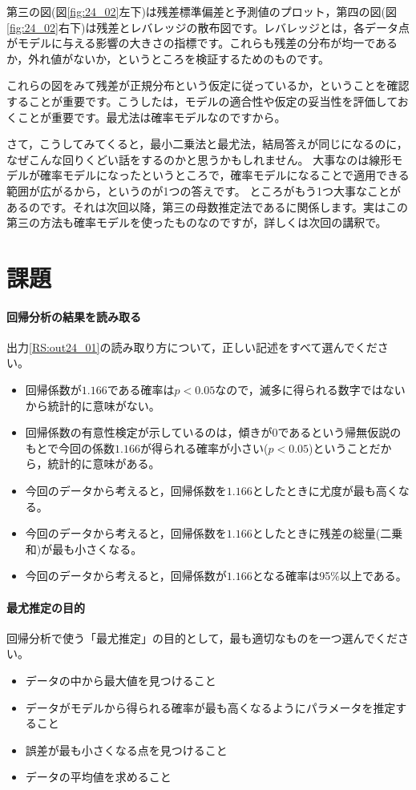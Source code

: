 \documentclass{ltjbook}
\begin{document}
第三の図(図\ref{fig:24_02}左下)は残差標準偏差と予測値のプロット，第四の図(図\ref{fig:24_02}右下)は残差とレバレッジの散布図です。レバレッジとは，各データ点がモデルに与える影響の大きさの指標です。これらも残差の分布が均一であるか，外れ値がないか，というところを検証するためのものです。

これらの図をみて残差が正規分布という仮定に従っているか，ということを確認することが重要です。こうしたは，モデルの適合性や仮定の妥当性を評価しておくことが重要です。最尤法は確率モデルなのですから。

さて，こうしてみてくると，最小二乗法と最尤法，結局答えが同じになるのに，なぜこんな回りくどい話をするのかと思うかもしれません。
大事なのは線形モデルが確率モデルになったというところで，確率モデルになることで適用できる範囲が広がるから，というのが1つの答えです。
ところがもう1つ大事なことがあるのです。それは次回以降，第三の母数推定法であるに関係します。実はこの第三の方法も確率モデルを使ったものなのですが，詳しくは次回の講釈で。

\section{課題}
\paragraph{回帰分析の結果を読み取る}出力\ref{RS:out24_01}の読み取り方について，正しい記述をすべて選んでください。
\begin{itemize}
	\item 回帰係数が$1.166$である確率は$p<0.05$なので，滅多に得られる数字ではないから統計的に意味がない。
	\item 回帰係数の有意性検定が示しているのは，傾きが0であるという帰無仮説のもとで今回の係数$1.166$が得られる確率が小さい($p<0.05$)ということだから，統計的に意味がある。
	\item 今回のデータから考えると，回帰係数を$1.166$としたときに尤度が最も高くなる。
	\item 今回のデータから考えると，回帰係数を$1.166$としたときに残差の総量(二乗和)が最も小さくなる。
	\item 今回のデータから考えると，回帰係数が$1.166$となる確率は95\%以上である。
\end{itemize}

\paragraph{最尤推定の目的}
回帰分析で使う「最尤推定」の目的として，最も適切なものを一つ選んでください。
\begin{itemize}
	\item データの中から最大値を見つけること
	\item データがモデルから得られる確率が最も高くなるようにパラメータを推定すること
	\item 誤差が最も小さくなる点を見つけること
	\item データの平均値を求めること
\end{itemize}
\end{document}
